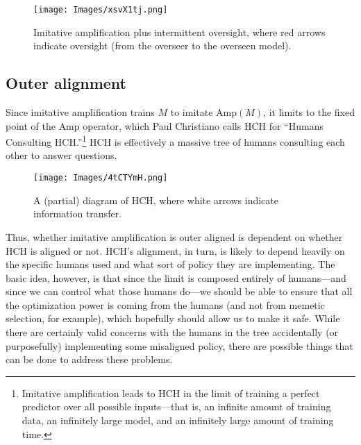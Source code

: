 \documentclass[
  onecolumn,
  natbib,
]{miri-tech-article}
\begin{document}
\vspace{4mm}

\begin{figure}[H]
  \centering
  \texttt{[image: Images/xsvX1tj.png]}
  \caption{Imitative amplification plus intermittent oversight, where red arrows indicate oversight (from the overseer to the overseen model).}
\end{figure}

\vspace{2mm}

\subsection{Outer alignment} Since imitative amplification trains $M$ to imitate $\text{Amp}(M)$, it limits to the fixed point of the $\text{Amp}$ operator, which Paul Christiano calls HCH for ``Humans Consulting HCH.''\footnote{Imitative amplification leads to HCH in the limit of training a perfect predictor over all possible inputs---that is, an infinite amount of training data, an infinitely large model, and an infinitely large amount of training time.}\cite{strong_hch} HCH is effectively a massive tree of humans consulting each other to answer questions.

\vspace{4mm}

\begin{figure}[h!]
  \centering
  \texttt{[image: Images/4tCTYmH.png]}
  \caption{A (partial) diagram of HCH, where white arrows indicate information transfer.}
\end{figure}

\vspace{2mm}

\noindent Thus, whether imitative amplification is outer aligned is dependent on whether HCH is aligned or not. HCH's alignment, in turn, is likely to depend heavily on the specific humans used and what sort of policy they are implementing. The basic idea, however, is that since the limit is composed entirely of humans---and since we can control what those humans do---we should be able to ensure that all the optimization power is coming from the humans (and not from memetic selection, for example), which hopefully should allow us to make it safe. While there are certainly valid concerns with the humans in the tree accidentally (or purposefully) implementing some misaligned policy, there are possible things that can be done to address these problems.\cite{universality}
\end{document}
